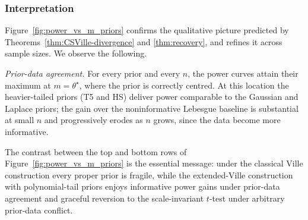 \documentclass{article}%
\begin{document}
\subsubsection{Interpretation}\label{ssec:exp-interp}

Figure~\ref{fig:power_vs_m_priors} confirms the qualitative picture
predicted by Theorems~\ref{thm:CSVille-divergence} and
\ref{thm:recovery}, and refines it across sample sizes. We observe the following.

\emph{Prior-data agreement.} For every prior and every \(n\), the power
curves attain their maximum at \(m=\theta^\star\), where the prior is
correctly centred. At this location the heavier-tailed priors (T5 and
HS) deliver power comparable to the Gaussian and Laplace priors;
the gain over the noninformative Lebesgue baseline is substantial at
small \(n\) and progressively erodes as \(n\) grows, since the data become more informative.



The contrast between the top and bottom rows of
Figure~\ref{fig:power_vs_m_priors} is the essential message: under the
classical Ville construction every proper prior is fragile, while the
extended-Ville construction with polynomial-tail priors enjoys
informative power gains under prior-data agreement and graceful
reversion to the scale-invariant \(t\)-test under arbitrary
prior-data conflict.
\end{document}
